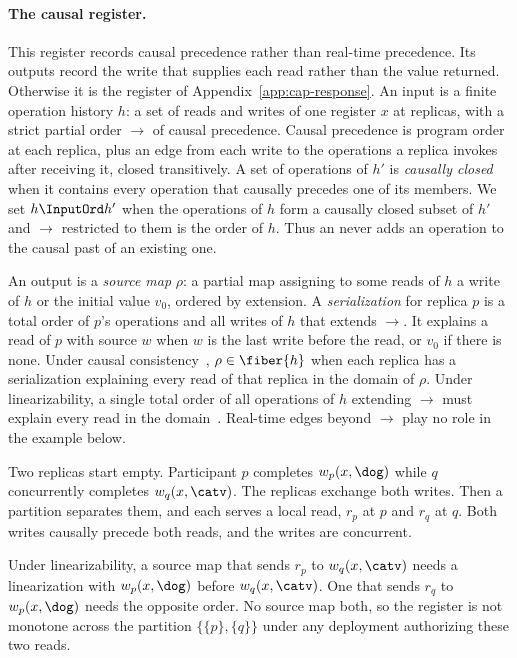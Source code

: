\paragraph{The causal register.}
This register records causal precedence rather than real-time precedence.
Its outputs record the write that supplies each read rather than the value
returned.  Otherwise it is the register of Appendix~\ref{app:cap-response}.
An input is a finite operation history $h$: a set of reads and writes of one
register $x$ at replicas, with a strict partial order $\to$ of causal
precedence.  Causal precedence is program order at each replica, plus an edge
from each write to the operations a replica invokes after receiving it,
closed transitively.  A set of operations of $h'$ is \emph{causally closed}
when it contains every operation that causally precedes one of its members.
We set $h\InputOrd h'$ when the operations of $h$ form a causally closed
subset of $h'$ and $\to$ restricted to them is the order of $h$.  Thus an
\indesc never adds an operation to the causal past of an existing one.

An output is a \emph{source map} $\rho$: a partial map assigning to some reads
of $h$ a write of $h$ or the initial value $v_0$, ordered by extension.  A
\emph{serialization} for replica $p$ is a total order of $p$'s operations and
all writes of $h$ that extends $\to$.  It explains a read of $p$ with source
$w$ when $w$ is the last write before the read, or $v_0$ if there is none.
Under causal consistency~\cite{lamport1978time,ahamad1995causal},
$\rho\in\fiber{h}$ when each replica has a serialization explaining every read
of that replica in the domain of $\rho$.  Under linearizability, a single
total order of all operations of $h$ extending $\to$ must explain every read
in the domain~\cite{herlihy1990linearizability}.  Real-time edges beyond $\to$
play no role in the example below.

Two replicas start empty.  Participant $p$ completes $w_p(x,\dog)$ while $q$
concurrently completes $w_q(x,\catv)$.  The replicas exchange both writes.
Then a partition separates them, and each serves a local read, $r_p$ at $p$
and $r_q$ at $q$.  Both writes causally precede both reads, and the writes are
concurrent.

Under linearizability, a source map that sends $r_p$ to $w_q(x,\catv)$ needs a
linearization with $w_p(x,\dog)$ before $w_q(x,\catv)$.  One that sends $r_q$
to $w_p(x,\dog)$ needs the opposite order.  No source map \outrel both, so the
register is not monotone across the partition $\{\{p\},\{q\}\}$ under any
deployment authorizing these two reads.

